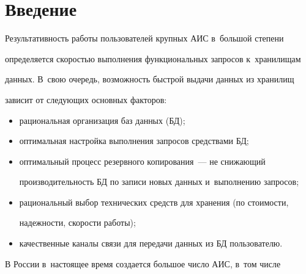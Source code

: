 




 \thispagestyle{headings}


 


 \vspace*{-18pt}


  


\section{Введение}





\vspace*{-4pt}





  Результативность работы пользователей крупных АИС в~большой степени 


определяется скоростью выполнения функциональных запросов к~хранилищам 


данных. В~свою очередь, возможность быстрой выдачи данных из хранилищ 


зависит от следующих основных факторов:


  \begin{itemize}


\item рациональная организация баз данных (БД);


\item оптимальная настройка выполнения запросов средствами БД;


\item оптимальный процесс резервного копирования~--- не снижающий 


производительность БД по записи новых данных и~выполнению запросов;


\item рациональный выбор технических средств для хранения (по стоимости, 


надежности, скорости работы);


\item качественные каналы связи для передачи данных из БД пользователю.


\end{itemize}





  В России в~настоящее время создается большое число АИС, в~том числе 


